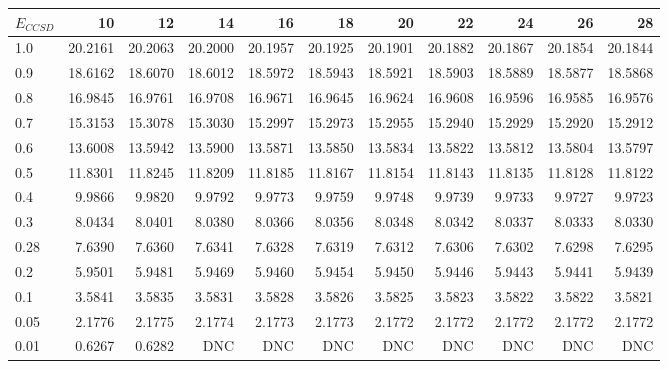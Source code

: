 \begin{landscape}
\begin{table}
\begin{center}
\begin{tabular}{l|rrrrrrrrrr}
\hline 
$E_{CCSD}$ & 10 & 12 & 14 & 16 & 18 & 20 & 22 & 24 & 26 & 28 \\
\hline \hline
1.0 & 20.2161 & 20.2063 & 20.2000 & 20.1957 & 20.1925 & 20.1901 & 20.1882 & 20.1867 & 20.1854 & 20.1844 \\ 
0.9 & 18.6162 & 18.6070 & 18.6012 & 18.5972 & 18.5943 & 18.5921 & 18.5903 & 18.5889 & 18.5877 & 18.5868 \\ 
0.8 & 16.9845 & 16.9761 & 16.9708 & 16.9671 & 16.9645 & 16.9624 & 16.9608 & 16.9596 & 16.9585 & 16.9576 \\ 
0.7 & 15.3153 & 15.3078 & 15.3030 & 15.2997 & 15.2973 & 15.2955 & 15.2940 & 15.2929 & 15.2920 & 15.2912 \\ 
0.6 & 13.6008 & 13.5942 & 13.5900 & 13.5871 & 13.5850 & 13.5834 & 13.5822 & 13.5812 & 13.5804 & 13.5797 \\ 
0.5 & 11.8301 & 11.8245 & 11.8209 & 11.8185 & 11.8167 & 11.8154 & 11.8143 & 11.8135 & 11.8128 & 11.8122 \\ 
0.4 & 9.9866 & 9.9820 & 9.9792 & 9.9773 & 9.9759 & 9.9748       &  9.9739 & 9.9733  &  9.9727 &  9.9723 \\ 
0.3 & 8.0434 & 8.0401 & 8.0380 & 8.0366 & 8.0356 & 8.0348       &  8.0342 & 8.0337  &  8.0333 &  8.0330 \\ 
0.28 & 7.6390 & 7.6360 & 7.6341 & 7.6328 & 7.6319 & 7.6312      &  7.6306 & 7.6302  &  7.6298 &  7.6295 \\ 
0.2 & 5.9501 & 5.9481 & 5.9469 & 5.9460 & 5.9454 & 5.9450       &  5.9446 & 5.9443  &  5.9441 &  5.9439 \\ 
0.1 & 3.5841 & 3.5835 & 3.5831 & 3.5828 & 3.5826 & 3.5825       &  3.5823 & 3.5822  &  3.5822 &  3.5821 \\ 
0.05 & 2.1776 & 2.1775 & 2.1774 & 2.1773 & 2.1773 & 2.1772      &  2.1772 & 2.1772  &  2.1772 &  2.1772 \\ 
0.01 & 0.6267 & 0.6282 & DNC & DNC & DNC & DNC                  &  DNC    & DNC     &  DNC    &     DNC \\ 
\hline \hline
\end{tabular}
\end{center}
\end{table}
\end{landscape}

 
 

